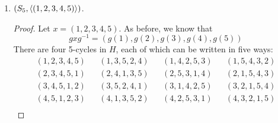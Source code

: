 \documentclass[../psets.tex]{subfiles}
\begin{document}
\begin{enumerate}
\begin{enumerate}
\begin{enumerate}
\begin{proof}
\begin{align*}
                    (1,4,3,2)&&
                        (1,4)(2,3)
                \end{align*}
                Letting $y=(4,3,2,1)$, we have $H=\gen{x}=\gen{y}$ and $gxg^{-1}\in\{x,y\}$ for all of the above $g$ and our chosen $x$. Thus, by the lemma, $gHg^{-1}=H$ for all of the above $g$. It follows that they are all elements of $N_G(H)$.\par
                Moreover, any value of $g$ that would make $g(1,3)(2,4)g^{-1}$ equal to some other value of $H$ has already been included in the above list, so we have no additional cases to check from there.\par
                Of course, all $g\in G$ satisfy $geg^{-1}\in H$, the $g$ there that have not already been mentioned would take $gxg^{-1}$ outside of $H$.\par
                Therefore,
                \begin{equation*}
                    \boxed{N_G(H) = \{e,(2,4),(1,2,3,4),(1,2)(3,4),(1,3)(2,4),(1,3),(1,4,3,2),(1,4)(2,3)\}}
                \end{equation*}
            \end{proof}
            \item $(S_5,\left\langle{(1,2,3,4,5)}\right\rangle)$.
            \begin{proof}
                Let $x=(1,2,3,4,5)$. As before, we know that
                \begin{equation*}
                    gxg^{-1} = (g(1),g(2),g(3),g(4),g(5))
                \end{equation*}
                There are four 5-cycles in $H$, each of which can be written in five ways:
                \begin{align*}
                    (1,2,3,4,5)&&
                        (1,3,5,2,4)&&
                            (1,4,2,5,3)&&
                                (1,5,4,3,2)\\
                    (2,3,4,5,1)&&
                        (2,4,1,3,5)&&
                            (2,5,3,1,4)&&
                                (2,1,5,4,3)\\
                    (3,4,5,1,2)&&
                        (3,5,2,4,1)&&
                            (3,1,4,2,5)&&
                                (3,2,1,5,4)\\
                    (4,5,1,2,3)&&
                        (4,1,3,5,2)&&
                            (4,2,5,3,1)&&
                                (4,3,2,1,5)\\

\end{align*}
\end{proof}
\end{enumerate}
\end{enumerate}
\end{enumerate}
\end{document}
